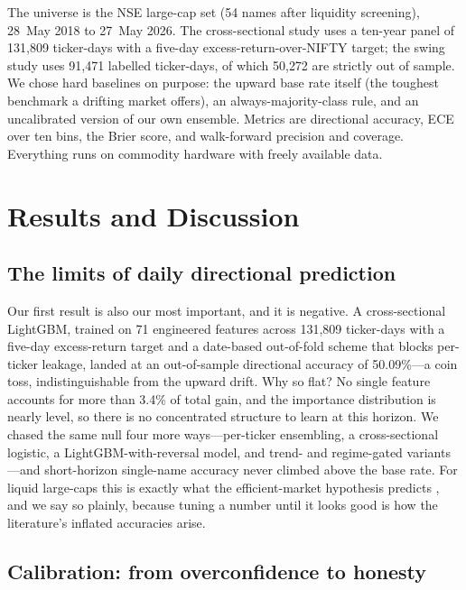 \documentclass[12pt,a4paper]{article}
\begin{document}
The universe is the NSE large-cap set (54 names after liquidity screening), 28~May
2018 to 27~May 2026. The cross-sectional study uses a ten-year panel of 131{,}809
ticker-days with a five-day excess-return-over-NIFTY target; the swing study uses
91{,}471 labelled ticker-days, of which 50{,}272 are strictly out of sample. We
chose hard baselines on purpose: the upward base rate itself (the toughest
benchmark a drifting market offers), an always-majority-class rule, and an
uncalibrated version of our own ensemble. Metrics are directional accuracy, ECE
over ten bins, the Brier score, and walk-forward precision and coverage. Everything
runs on commodity hardware with freely available data.

\section{Results and Discussion}

\subsection{The limits of daily directional prediction}

Our first result is also our most important, and it is negative. A cross-sectional
LightGBM, trained on 71 engineered features across 131{,}809 ticker-days with a
five-day excess-return target and a date-based out-of-fold scheme that blocks
per-ticker leakage, landed at an out-of-sample directional accuracy of
50.09\%---a coin toss, indistinguishable from the upward drift. Why so flat? No
single feature accounts for more than 3.4\% of total gain, and the importance
distribution is nearly level, so there is no concentrated structure to learn at
this horizon. We chased the same null four more ways---per-ticker ensembling, a
cross-sectional logistic, a LightGBM-with-reversal model, and trend- and
regime-gated variants---and short-horizon single-name accuracy never climbed above
the base rate. For liquid large-caps this is exactly what the efficient-market
hypothesis predicts \cite{r_fama}, and we say so plainly, because tuning a number
until it looks good is how the literature's inflated accuracies arise.

\subsection{Calibration: from overconfidence to honesty}
\end{document}
